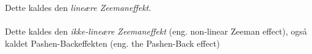 
Dette kaldes den \emph{lineære Zeemaneffekt}.


\paragraph{}

Dette kaldes den \emph{ikke-lineære Zeemaneffekt} (eng. non-linear Zeeman effect), også kaldet Pashen-Backeffekten (eng. the Pashen-Back effect)